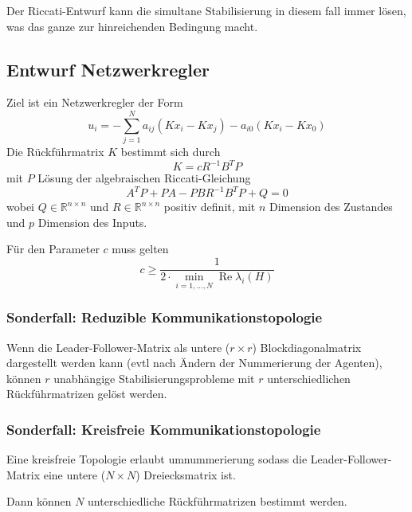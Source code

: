 Der Riccati-Entwurf kann die simultane Stabilisierung in diesem fall immer lösen,
was das ganze zur hinreichenden Bedingung macht.

\subsection{Entwurf Netzwerkregler}
\label{sec:lf_nw_regler_entwurf}
Ziel ist ein Netzwerkregler der Form
\begin{equation}
    u_i = -\sum_{j=1}^N a_{ij} (Kx_i - Kx_j) - a_{i0} (Kx_i - Kx_0)
\end{equation}
Die Rückführmatrix $K$ bestimmt sich durch
\begin{equation}
    K=c R^{-1} B^T P
\end{equation}
mit $P$ Lösung der algebraischen Riccati-Gleichung
\begin{equation}
    \tag{ARE}
    A^T P + P A - P B R^{-1} B^T P + Q = 0
\end{equation}
wobei $Q \in \mathbb{R}^{n\times n}$ und $R \in \mathbb{R}^{n\times n}$
positiv definit, mit $n$ Dimension des Zustandes und $p$ Dimension des
Inputs.

Für den Parameter $c$ muss gelten
\begin{equation}
    c \geq \frac{1}{2 \cdot \min_{i=1,\ldots,N} \operatorname{Re} \lambda_i(H)}
\end{equation}


\subsubsection{Sonderfall: Reduzible Kommunikationstopologie}
Wenn die Leader-Follower-Matrix als untere ($r\times r$) Blockdiagonalmatrix
dargestellt werden kann (evtl nach Ändern der Nummerierung der Agenten),
können $r$ unabhängige Stabilisierungsprobleme mit $r$ unterschiedlichen
Rückführmatrizen gelöst werden.

\subsubsection{Sonderfall: Kreisfreie Kommunikationstopologie}
Eine kreisfreie Topologie erlaubt umnummerierung sodass die
Leader-Follower-Matrix eine untere ($N\times N$) Dreiecksmatrix ist.

Dann können $N$ unterschiedliche Rückführmatrizen bestimmt werden.

